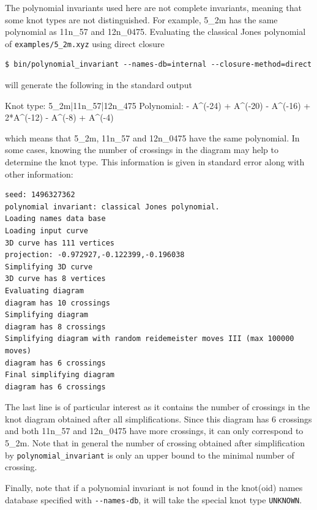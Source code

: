 The polynomial invariants used here are not complete invariants, meaning that some knot types are not distinguished. For example, 5\_2m has the same polynomial as 11n\_57 and 12n\_0475. Evaluating the classical Jones polynomial of \lstinline{examples/5_2m.xyz} using direct closure 
\begin{lstlisting}
$ bin/polynomial_invariant --names-db=internal --closure-method=direct
\end{lstlisting}
will generate the following in the standard output
\begin{lstlistingsmall}
Knot type: 5_2m|11n_57|12n_475  Polynomial:  - A^(-24) + A^(-20) - A^(-16) + 2*A^(-12) - A^(-8) + A^(-4)
\end{lstlistingsmall}
which means that 5\_2m, 11n\_57 and 12n\_0475 have the same polynomial. In some cases, knowing the number of crossings in the diagram may help to determine the knot type. This information is given in standard error along with other information:
\begin{lstlisting}
seed: 1496327362
polynomial invariant: classical Jones polynomial.
Loading names data base
Loading input curve
3D curve has 111 vertices
projection: -0.972927,-0.122399,-0.196038
Simplifying 3D curve
3D curve has 8 vertices
Evaluating diagram
diagram has 10 crossings
Simplifying diagram
diagram has 8 crossings
Simplifying diagram with random reidemeister moves III (max 100000 moves)
diagram has 6 crossings
Final simplifying diagram
diagram has 6 crossings
\end{lstlisting}
The last line is of particular interest as it contains the number of crossings in the knot diagram obtained after all simplifications. Since this diagram has 6 crossings and both 11n\_57 and 12n\_0475 have more crossings, it can only correspond to 5\_2m. Note that in general the number of crossing obtained after simplification by \lstinline{polynomial_invariant} is only an upper bound to the minimal number of crossing.

Finally, note that if a polynomial invariant is not found in the knot(oid) names database specified with  \lstinline{--names-db}, it will take the special knot type \lstinline{UNKNOWN}.

